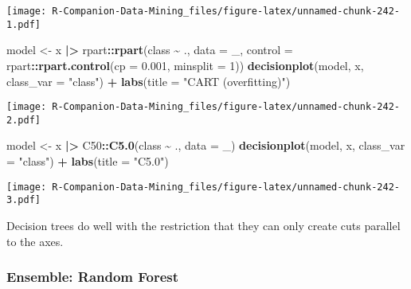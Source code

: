 \documentclass[
  notitlepage]{book}
\newenvironment{Shaded}{\begin{snugshade}}{\end{snugshade}}
\newcommand{\DataTypeTok}[1]{\textcolor[rgb]{0.13,0.29,0.53}{#1}}
\newcommand{\DecValTok}[1]{\textcolor[rgb]{0.00,0.00,0.81}{#1}}
\newcommand{\ErrorTok}[1]{\textcolor[rgb]{0.64,0.00,0.00}{\textbf{#1}}}
\newcommand{\FloatTok}[1]{\textcolor[rgb]{0.00,0.00,0.81}{#1}}
\newcommand{\KeywordTok}[1]{\textcolor[rgb]{0.13,0.29,0.53}{\textbf{#1}}}
\newcommand{\NormalTok}[1]{#1}
\newcommand{\OperatorTok}[1]{\textcolor[rgb]{0.81,0.36,0.00}{\textbf{#1}}}
\newcommand{\StringTok}[1]{\textcolor[rgb]{0.31,0.60,0.02}{#1}}
\begin{document}
\texttt{[image: R-Companion-Data-Mining\_files/figure-latex/unnamed-chunk-242-1.pdf]}

\begin{Shaded}
\begin{Highlighting}[]
\NormalTok{model \textless{}{-}}\StringTok{ }\NormalTok{x }\OperatorTok{|}\ErrorTok{\textgreater{}}\StringTok{ }\NormalTok{rpart}\OperatorTok{::}\KeywordTok{rpart}\NormalTok{(class }\OperatorTok{\textasciitilde{}}\StringTok{ }\NormalTok{., }\DataTypeTok{data =}\NormalTok{ \_,}
  \DataTypeTok{control =}\NormalTok{ rpart}\OperatorTok{::}\KeywordTok{rpart.control}\NormalTok{(}\DataTypeTok{cp =} \FloatTok{0.001}\NormalTok{, }\DataTypeTok{minsplit =} \DecValTok{1}\NormalTok{))}
\KeywordTok{decisionplot}\NormalTok{(model, x, }\DataTypeTok{class\_var =} \StringTok{"class"}\NormalTok{) }\OperatorTok{+}\StringTok{ }
\StringTok{  }\KeywordTok{labs}\NormalTok{(}\DataTypeTok{title =} \StringTok{"CART (overfitting)"}\NormalTok{)}
\end{Highlighting}
\end{Shaded}

\texttt{[image: R-Companion-Data-Mining\_files/figure-latex/unnamed-chunk-242-2.pdf]}

\begin{Shaded}
\begin{Highlighting}[]
\NormalTok{model \textless{}{-}}\StringTok{ }\NormalTok{x }\OperatorTok{|}\ErrorTok{\textgreater{}}\StringTok{ }\NormalTok{C50}\OperatorTok{::}\KeywordTok{C5.0}\NormalTok{(class }\OperatorTok{\textasciitilde{}}\StringTok{ }\NormalTok{., }\DataTypeTok{data =}\NormalTok{ \_)}
\KeywordTok{decisionplot}\NormalTok{(model, x, }\DataTypeTok{class\_var =} \StringTok{"class"}\NormalTok{) }\OperatorTok{+}\StringTok{ }
\StringTok{  }\KeywordTok{labs}\NormalTok{(}\DataTypeTok{title =} \StringTok{"C5.0"}\NormalTok{)}
\end{Highlighting}
\end{Shaded}

\texttt{[image: R-Companion-Data-Mining\_files/figure-latex/unnamed-chunk-242-3.pdf]}

Decision trees do well with the restriction that they can only create
cuts parallel to the axes.

\hypertarget{ensemble-random-forest-1}{%
\subsubsection{Ensemble: Random Forest}\label{ensemble-random-forest-1}}
\end{document}
